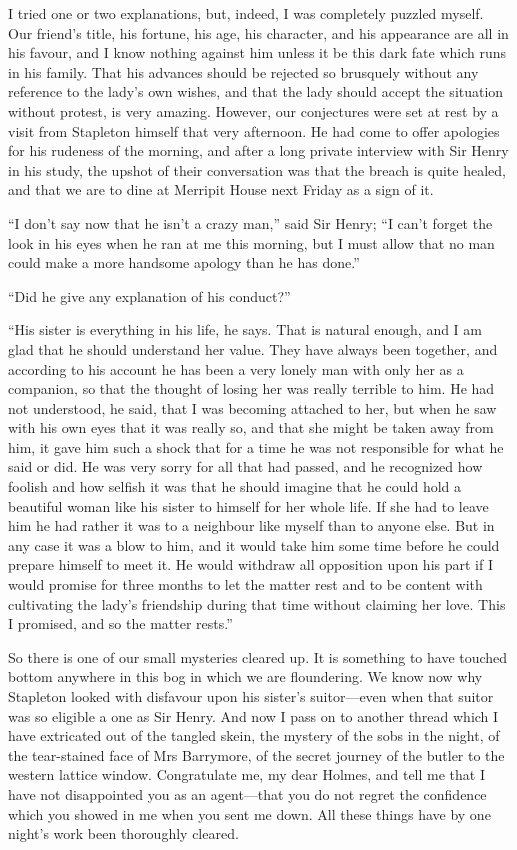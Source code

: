 \documentclass[paper=a5,BCOR=7mm,twoside,DIV=calc,12pt,usegeometry,openany,chapterprefix,endperiod,headings=big]{scrbook} %
\begin{document}
I tried one or two explanations, but, indeed, I was completely puzzled myself. Our friend's title, his fortune, his age, his character, and his appearance are all in his favour, and I know nothing against him unless it be this dark fate which runs in his family. That his advances should be rejected so brusquely without any reference to the lady's own wishes, and that the lady should accept the situation without protest, is very amazing. However, our conjectures were set at rest by a visit from Stapleton himself that very afternoon. He had come to offer apologies for his rudeness of the morning, and after a long private interview with Sir Henry in his study, the upshot of their conversation was that the breach is quite healed, and that we are to dine at Merripit House next Friday as a sign of it.

\enquote{I don't say now that he isn't a crazy man,} said Sir Henry; \enquote{I can't forget the look in his eyes when he ran at me this morning, but I must allow that no man could make a more handsome apology than he has done.}

\enquote{Did he give any explanation of his conduct?}

\enquote{His sister is everything in his life, he says. That is natural e\-nough, and I am glad that he should understand her value. They have always been together, and according to his account he has been a very lonely man with only her as a companion, so that the thought of losing her was really terrible to him. He had not understood, he said, that I was becoming attached to her, but when he saw with his own eyes that it was really so, and that she might be taken away from him, it gave him such a shock that for a time he was not responsible for what he said or did. He was very sorry for all that had passed, and he recognized how foolish and how selfish it was that he should imagine that he could hold a beautiful woman like his sister to himself for her whole life. If she had to leave him he had rather it was to a neighbour like myself than to anyone else. But in any case it was a blow to him, and it would take him some time before he could prepare himself to meet it. He would withdraw all opposition upon his part if I would promise for three months to let the matter rest and to be content with cultivating the lady's friendship during that time without claiming her love. This I promised, and so the matter rests.}

So there is one of our small mysteries cleared up. It is something to have touched bottom anywhere in this bog in which we are floundering. We know now why Stapleton looked with disfavour upon his sister's suitor---even when that suitor was so eligible a one as Sir Henry. And now I pass on to another thread which I have extricated out of the tangled skein, the mystery of the sobs in the night, of the tear-stained face of Mrs Barrymore, of the secret journey of the butler to the western lattice window. Congratulate me, my dear Holmes, and tell me that I have not disappointed you as an agent---that you do not regret the confidence which you showed in me when you sent me down. All these things have by one night's work been thoroughly cleared.
\end{document}
